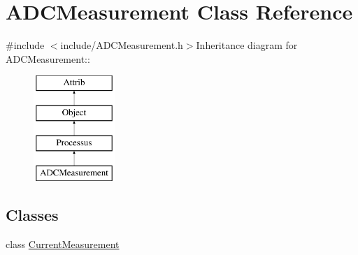 \hypertarget{classADCMeasurement}{
\section{ADCMeasurement Class Reference}
\label{classADCMeasurement}
}


{\ttfamily \#include $<$include/ADCMeasurement.h$>$}Inheritance diagram for ADCMeasurement::\begin{figure}[H]
\begin{center}
\leavevmode
\includegraphics[height=4cm]{classADCMeasurement}
\end{center}
\end{figure}
\subsection*{Classes}
\begin{DoxyCompactItemize}
\item 
class \hyperlink{classADCMeasurement_1_1CurrentMeasurement}{CurrentMeasurement}
\end{DoxyCompactItemize}
